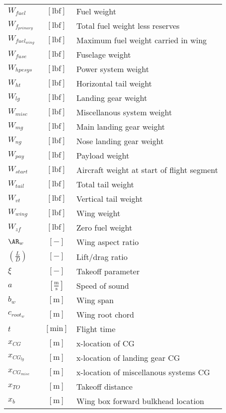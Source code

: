 {\begin{supertabular}{lcl}
$W_{fuel}$ & $~\mathrm{[lbf]}$ & Fuel weight \\
$W_{f_{primary}}$ & $~\mathrm{[lbf]}$ & Total fuel weight less reserves\\
$W_{fuel_{wing}}$ & $~\mathrm{[lbf]}$ & Maximum fuel weight carried in wing\\
$W_{fuse}$ & $~\mathrm{[lbf]}$ & Fuselage weight \\
$W_{hpesys}$ & $~\mathrm{[lbf]}$ & Power system weight \\
$W_{ht}$ & $~\mathrm{[lbf]}$ & Horizontal tail weight \\
$W_{lg}$ & $~\mathrm{[lbf]}$ & Landing gear weight \\
$W_{misc}$ & $~\mathrm{[lbf]}$ & Miscellanous system weight\\
$W_{mg}$ & $~\mathrm{[lbf]}$ & Main landing gear weight \\
$W_{ng}$ & $~\mathrm{[lbf]}$ & Nose landing gear weight \\
$W_{pay}$ & $~\mathrm{[lbf]}$ & Payload weight \\
$W_{start}$ & $~\mathrm{[lbf]}$ & Aircraft weight at start of flight segment\\
$W_{tail}$ & $~\mathrm{[lbf]}$ & Total tail weight\\
$W_{vt}$ & $~\mathrm{[lbf]}$ & Vertical tail weight \\
$W_{wing}$ & $~\mathrm{[lbf]}$ & Wing weight \\
$W_{zf}$ & $~\mathrm{[lbf]}$ & Zero fuel weight \\
$\AR_w$ & $~[-]$ & Wing aspect ratio \\
$\left(\frac{L}{D}\right)$ & $~[-]$ & Lift/drag ratio \\
$\xi$ & $~[-]$ & Takeoff parameter \\
$a$ & $~\mathrm{[\tfrac{m}{s}]}$ & Speed of sound\\
$b_w$ & $~\mathrm{[m]}$ & Wing span \\
$c_{root_{w}}$ & $~\mathrm{[m]}$ & Wing root chord \\
$t$ & $~\mathrm{[min]}$ & Flight time\\
$x_{CG}$ & $~\mathrm{[m]}$ & x-location of CG \\
$x_{CG_{lg}}$ & $~\mathrm{[m]}$ & x-location of landing gear CG \\
$x_{CG_{misc}}$ & $~\mathrm{[m]}$ & x-location of miscellanous systems CG \\
$x_{TO}$ & $~\mathrm{[m]}$ & Takeoff distance \\
$x_{b}$ & $~\mathrm{[m]}$ & Wing box forward bulkhead location \\

\end{supertabular}}
